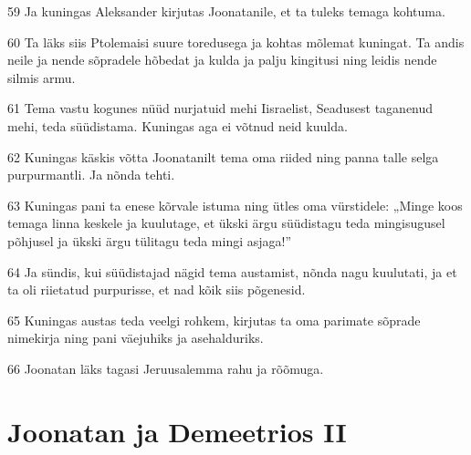 \par 59 Ja kuningas Aleksander kirjutas Joonatanile, et ta tuleks temaga kohtuma.
\par 60 Ta läks siis Ptolemaisi suure toredusega ja kohtas mõlemat kuningat. Ta andis neile ja nende sõpradele hõbedat ja kulda ja palju kingitusi ning leidis nende silmis armu.
\par 61 Tema vastu kogunes nüüd nurjatuid mehi Iisraelist, Seadusest taganenud mehi, teda süüdistama. Kuningas aga ei võtnud neid kuulda.
\par 62 Kuningas käskis võtta Joonatanilt tema oma riided ning panna talle selga purpurmantli. Ja nõnda tehti.
\par 63 Kuningas pani ta enese kõrvale istuma ning ütles oma vürstidele: „Minge koos temaga linna keskele ja kuulutage, et ükski ärgu süüdistagu teda mingisugusel põhjusel ja ükski ärgu tülitagu teda mingi asjaga!”
\par 64 Ja sündis, kui süüdistajad nägid tema austamist, nõnda nagu kuulutati, ja et ta oli riietatud purpurisse, et nad kõik siis põgenesid.
\par 65 Kuningas austas teda veelgi rohkem, kirjutas ta oma parimate sõprade nimekirja ning pani väejuhiks ja asehalduriks.
\par 66 Joonatan läks tagasi Jeruusalemma rahu ja rõõmuga. 

\section*{Joonatan ja Demeetrios II}

